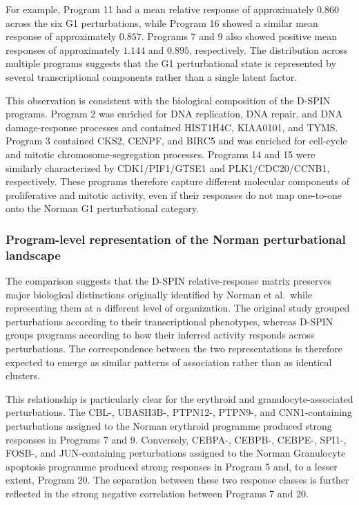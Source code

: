 \documentclass[11pt,a4paper]{article}
\begin{document}
For example, Program 11 had a mean relative response of approximately $0.860$ across the six G1 perturbations, while Program 16 showed a similar mean response of approximately $0.857$. Programs 7 and 9 also showed positive mean responses of approximately $1.144$ and $0.895$, respectively. The distribution across multiple programs suggests that the G1 perturbational state is represented by several transcriptional components rather than a single latent factor.

This observation is consistent with the biological composition of the D-SPIN programs. Program 2 was enriched for DNA replication, DNA repair, and DNA damage-response processes and contained HIST1H4C, KIAA0101, and TYMS. Program 3 contained CKS2, CENPF, and BIRC5 and was enriched for cell-cycle and mitotic chromosome-segregation processes. Programs 14 and 15 were similarly characterized by CDK1/PIF1/GTSE1 and PLK1/CDC20/CCNB1, respectively. These programs therefore capture different molecular components of proliferative and mitotic activity, even if their responses do not map one-to-one onto the Norman G1 perturbational category.

\subsubsection{Program-level representation of the Norman perturbational landscape}

The comparison suggests that the D-SPIN relative-response matrix preserves major biological distinctions originally identified by Norman et al.~while representing them at a different level of organization. The original study grouped perturbations according to their transcriptional phenotypes, whereas D-SPIN groups programs according to how their inferred activity responds across perturbations. The correspondence between the two representations is therefore expected to emerge as similar patterns of association rather than as identical clusters.

This relationship is particularly clear for the erythroid and granulocyte-associated perturbations. The CBL-, UBASH3B-, PTPN12-, PTPN9-, and CNN1-containing perturbations assigned to the Norman erythroid programme produced strong responses in Programs 7 and 9. Conversely, CEBPA-, CEBPB-, CEBPE-, SPI1-, FOSB-, and JUN-containing perturbations assigned to the Norman Granulocyte apoptosis programme produced strong responses in Program 5 and, to a lesser extent, Program 20. The separation between these two response classes is further reflected in the strong negative correlation between Programs 7 and 20.
\end{document}
